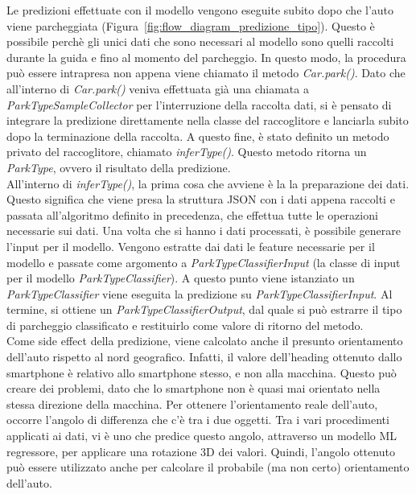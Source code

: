 Le predizioni effettuate con il modello vengono eseguite subito dopo che l'auto viene 
parcheggiata (Figura~\ref{fig:flow_diagram_predizione_tipo}). Questo è possibile perchè gli unici dati che sono necessari
al modello
sono quelli raccolti durante la guida e fino al momento del parcheggio. In questo modo,
la procedura può essere intrapresa non appena viene chiamato il metodo \emph{Car.park()}.
Dato che all'interno di \emph{Car.park()} veniva effettuata già una chiamata a 
\emph{ParkTypeSampleCollector} per l'interruzione della raccolta dati, si è pensato di 
integrare la predizione direttamente nella classe del raccoglitore e lanciarla subito
dopo la terminazione della raccolta. A questo fine, è stato definito un metodo privato
del raccoglitore, chiamato \emph{inferType()}. Questo metodo ritorna un \emph{ParkType},
ovvero il risultato della predizione.\\
All'interno di \emph{inferType()}, la prima cosa che avviene è la la preparazione dei 
dati. Questo significa che viene presa la struttura JSON con i dati appena raccolti e 
passata all'algoritmo definito in precedenza, che effettua tutte le operazioni necessarie
sui dati. Una volta che si hanno i dati processati, è possibile generare l'input per il 
modello. %
Vengono estratte dai dati le feature necessarie per il modello e passate come
argomento a \emph{ParkTypeClassifierInput} (la classe di input per il modello 
\emph{ParkTypeClassifier}). A questo punto viene istanziato un \emph{ParkTypeClassifier} 
viene eseguita la predizione su \emph{ParkTypeClassifierInput}. Al termine, si ottiene
un \emph{ParkTypeClassifierOutput}, dal quale si può estrarre il tipo di parcheggio 
classificato e restituirlo come valore di ritorno del metodo.\\
Come side effect della predizione, viene calcolato anche il presunto orientamento
dell'auto rispetto al nord geografico. Infatti, il valore dell'heading ottenuto 
dallo smartphone è relativo allo smartphone stesso, e non alla macchina. Questo 
può creare dei problemi, dato che lo smartphone non è quasi mai orientato nella 
stessa direzione della macchina. Per ottenere l'orientamento reale dell'auto,
occorre l'angolo di differenza che c'è tra i due oggetti. Tra i vari procedimenti 
applicati ai dati, vi è uno che predice questo angolo, attraverso un modello 
ML regressore, per applicare una rotazione 3D dei valori. Quindi, l'angolo ottenuto
può essere utilizzato anche per calcolare il probabile (ma non certo) orientamento
dell'auto.

